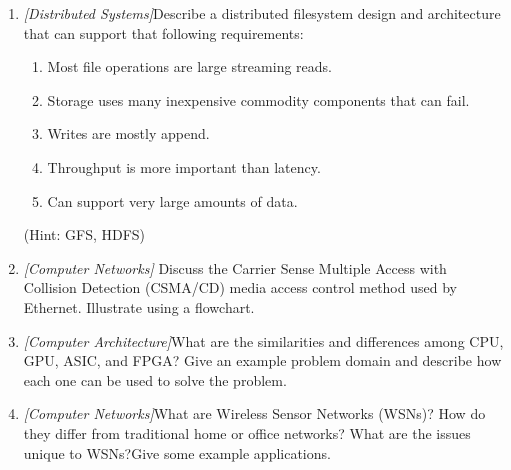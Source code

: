 \documentclass{article}
\begin{document}
\begin{enumerate}
	\item{\textit{[Distributed Systems]}Describe a distributed filesystem design and architecture that can support that following requirements:

		\begin{enumerate}
			\item{Most file operations are large streaming reads.}
			\item{Storage uses many inexpensive commodity components that can fail.}
			\item{Writes are mostly append.} 
			\item{Throughput is more important than latency.}
			\item{Can support very large amounts of data.}
		\end{enumerate}
		(Hint: GFS, HDFS)}
		
	\item{\textit{[Computer Networks]} Discuss the Carrier Sense Multiple Access with Collision Detection (CSMA/CD) media access control method used by Ethernet. Illustrate using a flowchart.
		}  	
  	
	\item{\textit{[Computer Architecture]}What are the similarities and differences among CPU, GPU, ASIC, and FPGA? Give an example problem domain and describe how each one can be used to solve the problem.}  	
  	
	\item{\textit{[Computer Networks]}What are Wireless Sensor Networks (WSNs)? How do they differ from traditional home or office networks? What are the issues unique to WSNs?Give some example applications.}  	
  	
\end{enumerate}

\begin{thebibliography}{9}

\end{thebibliography}
\end{document}
